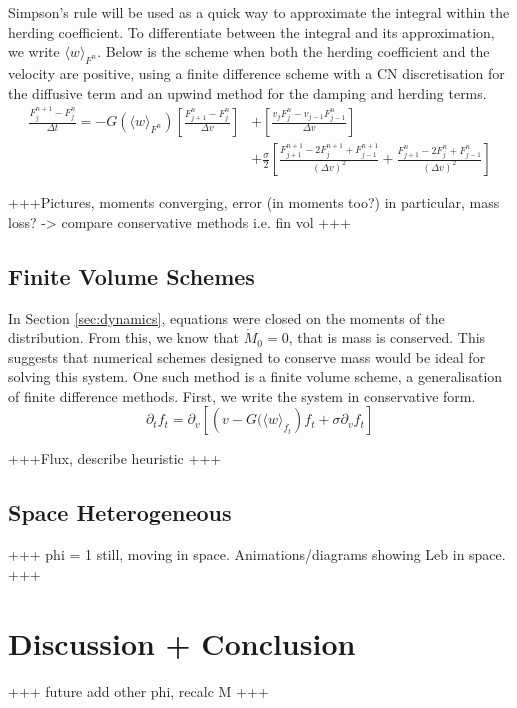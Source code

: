 \documentclass[11pt, a4paper, draft]{article}
\begin{document}
			Simpson's rule will be used as a quick way to approximate the integral within the herding coefficient. To differentiate between the integral and its approximation, we write \(\langle w\rangle_{F^n}\). Below is the scheme when both the herding coefficient and the velocity are positive, using a finite difference scheme with a CN discretisation for the diffusive term and an upwind method for the damping and herding terms.
			\begin{equation*}
			\begin{split}
				\frac{F_j^{n+1} - F_j^n}{\Delta t} = 	-G(\langle w\rangle_{F^n})\left[ \frac{F^n_{j+1} - F^n_{j}}{\Delta v}\right] &+\left[ \frac{v_{j}F^n_{j} - v_{j-1}F^n_{j-1}}{\Delta v}\right]\\ &+ \frac{\sigma}{2}\left[ \frac{F^{n+1}_{j+1} - 2F^{n+1}_j + F^{n+1}_{j-1}}{(\Delta v)^2} + \frac{F^{n}_{j+1} - 2F^{n}_j + F^{n}_{j-1}}{(\Delta v)^2}\right] 	 
			\end{split}
			\end{equation*}

			+++Pictures, moments converging, error (in moments too?) in particular, mass loss? -> compare conservative methods i.e. fin vol +++
        \subsection{Finite Volume Schemes}
            In Section \ref{sec:dynamics}, equations were closed on the moments of the distribution. From this, we know that \(\dot{M}_0 = 0\), that is mass is conserved. This suggests that numerical schemes designed to conserve mass would be ideal for solving this system. One such method is a finite volume scheme, a generalisation of finite difference methods. First, we write the system in conservative form. 
            \begin{equation}\label{eq:flux_space_hom}
                \partial_t f_t = \partial_v \left[\left(v-G(\langle w \rangle_{f_t}\right)f_t + \sigma \partial_v f_t \right]
            \end{equation}
            
            +++Flux, describe heuristic +++
        \subsection{Space Heterogeneous}
        +++ phi = 1 still, moving in space. Animations/diagrams showing Leb in space. +++
        
        \section{Discussion + Conclusion}
        +++ future add other phi, recalc M +++
	
	
	\appendix
\end{document}
